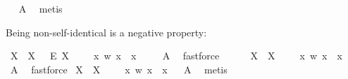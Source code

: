 \begin{isabellebody}
\ %
\endisadelimproof
%
\isatagproof
{}\isamarkupfalse%
\ A{}\ \isamarkupfalse%
\ metis%
\endisatagproof
{\isafoldproof}%
%
\isadelimproof
%
\endisadelimproof
%
\begin{isamarkuptext}%
Being non-self-identical is a negative property:%
\end{isamarkuptext}\isamarkuptrue%
\isamarkupfalse%
\ {\isachardoublequoteopen}{\isasymlfloor}{\isacharparenleft}\isactrlbold {\isasymexists}X{\isachardot}\ {\isasymP}\ X\ \ \isactrlbold {\isasymand}\ \isactrlbold {\isasymdiamond}\isactrlbold {\isasymexists}\isactrlsup E\ X{\isacharparenright}\ \isactrlbold {\isasymrightarrow}\ \ {\isasymP}\ {\isacharparenleft}\isactrlbold {\isasymrightharpoondown}\ {\isacharparenleft}{\isasymlambda}x\ w{\isachardot}\ {\isasymnot}x\ {\isacharequal}\ x{\isacharparenright}{\isacharparenright}{\isasymrfloor}{\isachardoublequoteclose}\ \isanewline
%
\isadelimproof
\ \ %
\endisadelimproof
%
\isatagproof
{}\isamarkupfalse%
\ A{}\ \isamarkupfalse%
\ fastforce%
\endisatagproof
{\isafoldproof}%
%
\isadelimproof
\isanewline
%
\endisadelimproof
\ \ \ \ \isanewline
{}\isamarkupfalse%
\ {\isachardoublequoteopen}{\isasymlfloor}{\isacharparenleft}\isactrlbold {\isasymexists}X{\isachardot}\ {\isasymP}\ X{\isacharparenright}\ \isactrlbold {\isasymrightarrow}\ \ {\isasymP}\ {\isacharparenleft}\isactrlbold {\isasymrightharpoondown}\ {\isacharparenleft}{\isasymlambda}x\ w{\isachardot}\ {\isasymnot}x\ {\isacharequal}\ x{\isacharparenright}{\isacharparenright}{\isasymrfloor}{\isachardoublequoteclose}%
\isadelimproof
\ %
\endisadelimproof
%
\isatagproof
{}\isamarkupfalse%
\ A{}\ \isamarkupfalse%
\ fastforce%
\endisatagproof
{\isafoldproof}%
%
\isadelimproof
%
\endisadelimproof
\isanewline
{}\isamarkupfalse%
\ {\isachardoublequoteopen}{\isasymlfloor}{\isacharparenleft}\isactrlbold {\isasymexists}X{\isachardot}\ {\isasymP}\ X{\isacharparenright}\ \isactrlbold {\isasymrightarrow}\ \ {\isasymP}\ {\isacharparenleft}\isactrlbold {\isasymrightharpoondown}\ {\isacharparenleft}{\isasymlambda}x\ w{\isachardot}\ {\isasymnot}x\ {\isacharequal}\ x{\isacharparenright}{\isacharparenright}{\isasymrfloor}{\isachardoublequoteclose}%
\isadelimproof
\ %
\endisadelimproof
%
\isatagproof
{}\isamarkupfalse%
\ A{}\ \isamarkupfalse%
\ metis%
\endisatagproof
{\isafoldproof}%
%
\isadelimproof
%
\endisadelimproof
%
\begin{isamarkuptext}%

\end{isamarkuptext}
\end{isabellebody}
